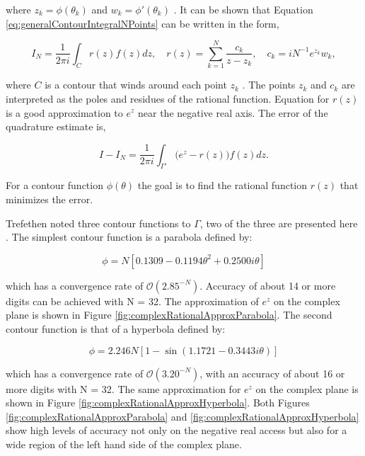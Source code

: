 \noindent where $z_{k} = \phi(\theta_{k})$ and  $w_{k} = \phi'(\theta_{k})$ \cite{Trefethen2006}. It can be shown that Equation \ref{eq:generalContourIntegralNPoints} can be written in the form,

\begin{equation}
    I_{N} = \frac{1}{2\pi i}\int_{C}r(z)f(z)dz, \quad r(z) = \sum_{k=1}^{N}\frac{c_{k}}{z-z_{k}}, \quad c_{k} = iN^{-1}e^{z_{k}}w_{k},
\end{equation}

\noindent where $C$ is a contour that winds around each point $z_{k}$ \cite{Trefethen2006}. The points $z_{k}$ and $c_{k}$ are interpreted as the poles and residues of the rational function. Equation for $r(z)$ is a good approximation to $e^{z}$ near the negative real axis. The error of the quadrature estimate is,

\begin{equation}
    I - I_{N} = \frac{1}{2\pi i}\int_{\Gamma'} \big(e^{z} - r(z)\big)f(z)dz.
\end{equation}{}

\noindent For a contour function $\phi(\theta)$ the goal is to find the rational function $r(z)$ that minimizes the error. 

Trefethen noted three contour functions to $\Gamma$, two of the three are presented here \cite{Trefethen2006}. The simplest contour function is a parabola defined by: 

\begin{equation}
    \phi = N[0.1309 - 0.1194\theta^{2} + 0.2500i\theta]
    \label{eq:parabolicContour}
\end{equation}

\noindent which has a convergence rate of $\mathcal{O}(2.85^{-N} )$. Accuracy of about 14 or more digits can be achieved with N = 32. The approximation of $e^{z}$ on the complex plane is shown in Figure \ref{fig:complexRationalApproxParabola}. The second contour function is that of a hyperbola defined by: 

\begin{equation}
    \phi = 2.246N[1 - \sin(1.1721 - 0.3443i\theta)]
    \label{eq:hyperbolicContour}
\end{equation}

\noindent which has a convergence rate of $\mathcal{O}(3.20^{-N} )$, with an accuracy of about 16 or more digits with N = 32. The same approximation for $e^{z}$ on the complex plane is shown in Figure \ref{fig:complexRationalApproxHyperbola}. Both Figures \ref{fig:complexRationalApproxParabola} and \ref{fig:complexRationalApproxHyperbola} show high levels of accuracy not only on the negative real access but also for a wide region of the left hand side of the complex plane. 

